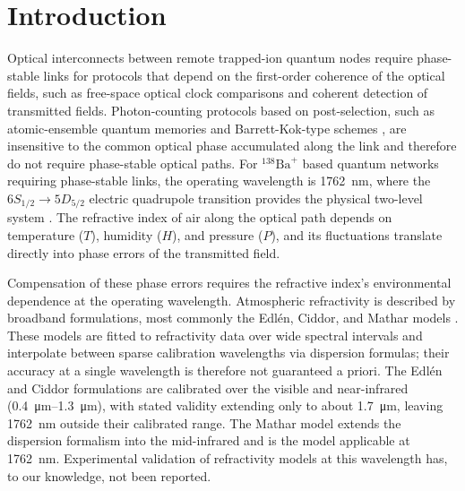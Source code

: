 \documentclass[aps,prapplied,reprint,groupedaddress,twocolumn,superscriptaddress,linenumbers]{revtex4-2}
\begin{document}
\maketitle

\section{Introduction}
\label{sec:intro}

Optical interconnects between remote trapped-ion quantum nodes require phase-stable links for protocols that depend on the first-order coherence of the optical fields, such as free-space optical clock comparisons \cite{giorgetta2013optical,shen2022free} and coherent detection of transmitted fields. Photon-counting protocols based on post-selection, such as atomic-ensemble quantum memories \cite{duan2001long} and Barrett-Kok-type schemes \cite{barrett2005efficient}, are insensitive to the common optical phase accumulated along the link and therefore do not require phase-stable optical paths. For $^{138}\mathrm{Ba}^+$ based quantum networks requiring phase-stable links, the operating wavelength is \SI{1762}{\nano\meter}, where the $6S_{1/2} \rightarrow 5D_{5/2}$ electric quadrupole transition provides the physical two-level system \cite{dietrich2009barium,arnold2020precision}. The refractive index of air along the optical path depends on temperature ($T$), humidity ($H$), and pressure ($P$), and its fluctuations translate directly into phase errors of the transmitted field.

Compensation of these phase errors requires the refractive index's environmental dependence at the operating wavelength. Atmospheric refractivity is described by broadband formulations, most commonly the Edl\'{e}n, Ciddor, and Mathar models \cite{edlen1966refractive,ciddor1996refractive,mathar2007refractive}. These models are fitted to refractivity data over wide spectral intervals and interpolate between sparse calibration wavelengths via dispersion formulas; their accuracy at a single wavelength is therefore not guaranteed a priori. The Edl\'{e}n and Ciddor formulations are calibrated over the visible and near-infrared (\SIrange{0.4}{1.3}{\micro\meter}), with stated validity extending only to about \SI{1.7}{\micro\meter}, leaving \SI{1762}{\nano\meter} outside their calibrated range. The Mathar model extends the dispersion formalism into the mid-infrared and is the model applicable at \SI{1762}{\nano\meter}. Experimental validation of refractivity models at this wavelength has, to our knowledge, not been reported.
\end{document}
